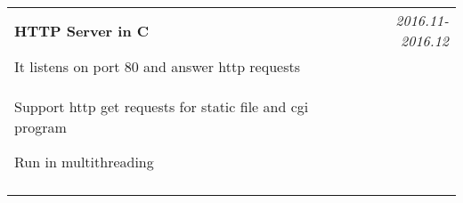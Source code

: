 \documentclass[a4paper,10pt]{article}
\begin{document}
\begin{tabular}{p{13.5cm}p{0.5cm}r}
\textbf{HTTP Server in C} && \emph{2016.11-2016.12} \\
\hspace{1em} It listens on port 80 and answer http requests && \vspace{-0.5em} \\
\begin{compactitem}
  \item Support http get requests for static file and cgi program\vspace{0.2em}
  \item Run in multithreading
\end{compactitem}&&\vspace{-2.2em} \\
\multicolumn{3}{c}{} \\



\end{tabular}


\end{document}
